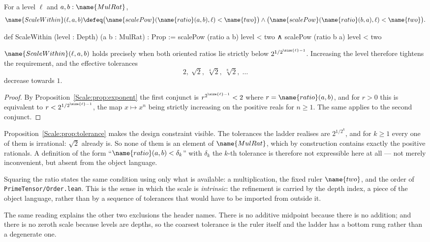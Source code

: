 \begin{definition}\label{Scale:def:scalewithin}
For a level $\ell$ and $a, b : \name{MulRat}$,
\[
  \name{ScaleWithin}(\ell, a, b) \defeq
    \bigl(\name{scalePow}(\name{ratio}(a,b), \ell) < \name{two}\bigr) \wedge
    \bigl(\name{scalePow}(\name{ratio}(b,a), \ell) < \name{two}\bigr).
\]
\end{definition}

\begin{leancode}
def ScaleWithin (level : Depth) (a b : MulRat) : Prop :=
  scalePow (ratio a b) level < two ∧
  scalePow (ratio b a) level < two
\end{leancode}

\begin{proposition}\label{Scale:prop:tolerance}
$\name{ScaleWithin}(\ell, a, b)$ holds precisely when both oriented ratios lie
strictly below $2^{1/2^{\size{\ell}-1}}$.  Increasing the level therefore
tightens the requirement, and the effective tolerances
\[
  2, \; \sqrt{2}, \; \sqrt[4]{2}, \; \sqrt[8]{2}, \; \dots
\]
decrease towards $1$.
\end{proposition}

\begin{proof}
By Proposition~\ref{Scale:prop:exponent} the first conjunct is
$r^{2^{\size{\ell}-1}} < 2$ where $r = \name{ratio}(a,b)$, and for $r > 0$ this
is equivalent to $r < 2^{1/2^{\size{\ell}-1}}$, the map $x \mapsto x^{n}$ being
strictly increasing on the positive reals for $n \geq 1$.  The same applies to
the second conjunct.
\end{proof}

\begin{designnote}
\label{Scale:note:no-roots}
Proposition~\ref{Scale:prop:tolerance} makes the design constraint visible.
The tolerances the ladder realises are $2^{1/2^{k}}$, and for $k \geq 1$ every
one of them is irrational: $\sqrt{2}$ already is.  So none of them is an
element of $\name{MulRat}$, which by construction contains exactly the positive
rationals.  A definition of the form ``$\name{ratio}(a,b) < \delta_k$'' with
$\delta_k$ the $k$-th tolerance is therefore not expressible here at all ---
not merely inconvenient, but absent from the object language.

Squaring the ratio states the same condition using only what is available: a
multiplication, the fixed ruler $\name{two}$, and the order of
\texttt{PrimeTensor/Order.lean}.  This is the sense in which the scale is
\emph{intrinsic}: the refinement is carried by the depth index, a piece of the
object language, rather than by a sequence of tolerances that would have to be
imported from outside it.

The same reading explains the other two exclusions the header names.  There is
no additive midpoint because there is no addition; and there is no zeroth
scale because levels are depths, so the coarsest tolerance is the ruler itself
and the ladder has a bottom rung rather than a degenerate one.
\end{designnote}

